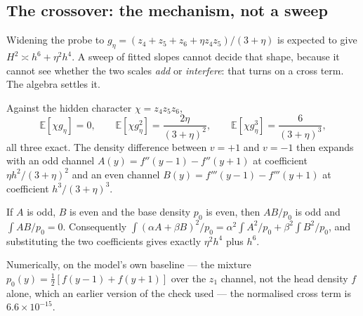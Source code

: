
\subsection{The crossover: the mechanism, not a sweep}
\label{sec:crossover}

Widening the probe to $g_{\eta}=(z_{4}+z_{5}+z_{6}+\eta z_{4}z_{5})/(3+\eta)$ is expected
to give $H^{2}\asymp h^{6}+\eta^{2}h^{4}$. A sweep of fitted slopes cannot decide that
shape, because it cannot see whether the two scales \emph{add} or \emph{interfere}: that
turns on a cross term. The algebra settles it.

Against the hidden character $\chi=z_{4}z_{5}z_{6}$,
\[
\mathbb{E}[\chi g_{\eta}]=0,\qquad
\mathbb{E}[\chi g_{\eta}^{2}]=\frac{2\eta}{(3+\eta)^{2}},\qquad
\mathbb{E}[\chi g_{\eta}^{3}]=\frac{6}{(3+\eta)^{3}},
\]
all three exact. The density difference between $v=+1$ and $v=-1$ then expands with an odd
channel $A(y)=f''(y-1)-f''(y+1)$ at coefficient $\eta h^{2}/(3+\eta)^{2}$ and an even
channel $B(y)=f'''(y-1)-f'''(y+1)$ at coefficient $h^{3}/(3+\eta)^{3}$.

\begin{theorem}
\label{thm:parity}
If $A$ is odd, $B$ is even and the base density $p_{0}$ is even, then $AB/p_{0}$ is odd and
$\int AB/p_{0}=0$. Consequently
$\int(\alpha A+\beta B)^{2}/p_{0}=\alpha^{2}\int A^{2}/p_{0}+\beta^{2}\int B^{2}/p_{0}$,
and substituting the two coefficients gives exactly $\eta^{2}h^{4}$ plus $h^{6}$.
\end{theorem}

Numerically, on the model's own baseline --- the mixture $p_{0}(y)=\tfrac12[f(y-1)+f(y+1)]$
over the $z_{1}$ channel, not the head density $f$ alone, which an earlier version of the
check used --- the normalised cross term is $6.6\times10^{-15}$.

